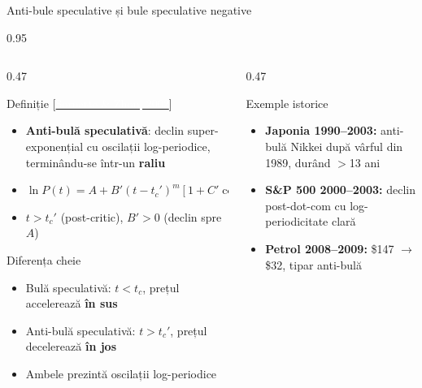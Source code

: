 \documentclass[9pt, aspectratio=169, t]{beamer}
\begin{document}
\begin{frame}{Anti-bule speculative și bule speculative negative}
    \begin{cminipage}{0.95\textwidth}
    {\scriptsize
    \begin{columns}[T]
        \begin{column}{0.47\textwidth}
            \begin{block}{Definiție {\scriptsize[\href{https://doi.org/10.1080/14697688.2002.0000014}{\textcolor{white}{Sornette \& Zhou, 2002}}]}}
                \begin{itemize}\setlength{\itemsep}{0pt}
                    \item \textbf{Anti-bulă speculativă}: declin super-exponențial cu oscilații log-periodice, terminându-se într-un \textbf{raliu}
                    \item $\ln P(t) = A + B'(t - t_c')^m[1 + C'\cos(\omega\ln(t - t_c') + \phi')]$
                    \item $t > t_c'$ (post-critic), $B' > 0$ (declin spre $A$)
                \end{itemize}
            \end{block}
            \vspace{-1mm}
            \begin{exampleblock}{Diferența cheie}
                \begin{itemize}\setlength{\itemsep}{0pt}
                    \item Bulă speculativă: $t < t_c$, prețul accelerează \textbf{în sus}
                    \item Anti-bulă speculativă: $t > t_c'$, prețul decelerează \textbf{în jos}
                    \item Ambele prezintă oscilații log-periodice
                \end{itemize}
            \end{exampleblock}
        \end{column}
        \begin{column}{0.47\textwidth}
            \begin{block}{Exemple istorice}
                \begin{itemize}\setlength{\itemsep}{1pt}
                    \item \textbf{Japonia 1990--2003:} anti-bulă Nikkei după vârful din 1989, durând $>$13 ani
                    \item \textbf{S\&P 500 2000--2003:} declin post-dot-com cu log-periodicitate clară
                    \item \textbf{Petrol 2008--2009:} \$147 $\to$ \$32, tipar anti-bulă
                \end{itemize}
            \end{block}


\end{column}
\end{columns}}
\end{cminipage}
\end{frame}
\end{document}
